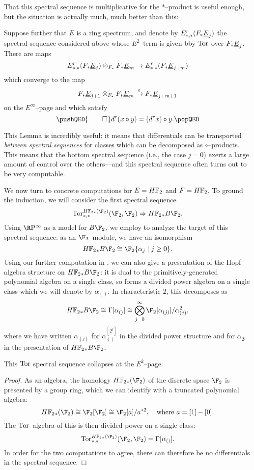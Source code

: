 That this spectral sequence is multiplicative for the \(\ast\)--product is useful enough, but the situation is actually much, much better than this:
\begin{lemma}\label{CircProductAndDifferentials}
Suppose further that \(E\) is a ring spectrum, and denote by \(E^r_{*, *}(F_* \OS{E}{j})\) the spectral sequence considered above whose \(E^2\)--term is given bby \(\operatorname{Tor}\) over \(F_* \OS{E}{j}\).  There are maps \[E^r_{*, *}(F_* \OS{E}{j}) \otimes_{F_*} F_* \OS{E}{m} \to E^r_{*, *}(F_* \OS{E}{j+m})\] which converge to the map \[F_* \OS{E}{j+1} \otimes_{F_*} F_* \OS{E}{m} \xrightarrow{\circ} F_* \OS{E}{j+m+1}\] on the \(E^\infty\)--page and which satisfy
\[
\pushQED{\qed}
d^r(x \circ y) = (d^r x) \circ y. \qedhere
\popQED
\]
\end{lemma}
\noindent This Lemma is incredibly useful: it means that differentials can be transported \emph{between spectral sequences} for classes which can be decomposed as \(\circ\)--products.  This means that the bottom spectral sequence (i.e., the case \(j = 0\)) exerts a large amount of control over the others---and this spectral sequence often turns out to be very computable.

We now turn to concrete computations for \(E = \HFtwo\) and \(F = \HFtwo\).  To ground the induction, we will consider the first spectral sequence \[\Tor^{\HFtwo_*(\F_2)}_{*, *}(\F_2, \F_2) \Rightarrow \HFtwo_* B\F_2.\]  Using \(\RP^\infty\) as a model for \(B\F_2\), we employ  to analyze the target of this spectral sequence: as an \(\F_2\)--module, we have an isomorphism \[\HFtwo_* B\F_2 \cong \F_2\{\alpha_j \mid j \ge 0\}.\]  Using our further computation in , we can also give a presentation of the Hopf algebra structure on \(\HFtwo_* B\F_2\): it is dual to the primitively-generated polynomial algebra on a single class, so forms a divided power algebra on a single class which we will denote by \(\alpha_{()}\).  In characteristic \(2\), this decomposes as \[\HFtwo_* B\F_2 \cong \Gamma[\alpha_{()}] \cong \bigotimes_{j=0}^\infty \F_2[\alpha_{(j)}] / \alpha_{(j)}^2,\] where we have written \(\alpha_{(j)}\) for \(\alpha_{()}^{[2^j]}\) in the divided power structure and for \(\alpha_{2^j}\) in the presentation of \(\HFtwo_* B\F_2\).

\begin{corollary}
This \(\operatorname{Tor}\) spectral sequence collapses at the \(E^2\)--page.
\end{corollary}
\begin{proof}
As an algebra, the homology \(\HFtwo_*(\F_2)\) of the discrete space \(\F_2\) is presented by a group ring, which we can identify with a truncated polynomial algebra: \[\HFtwo_*(\F_2) \cong \F_2[\F_2] \cong  \F_2[a] / a^{\ast 2}, \quad \text{where \(a = [1] - [0]\)}.\]  The \(\operatorname{Tor}\)--algebra of this is then divided power on a single class: \[\Tor^{\HFtwo_*(\F_2)}_{*, *}(\F_2, \F_2) = \Gamma[\alpha_{()}].\]  In order for the two computations to agree, there can therefore be no differentials in the spectral sequence.
\end{proof}

